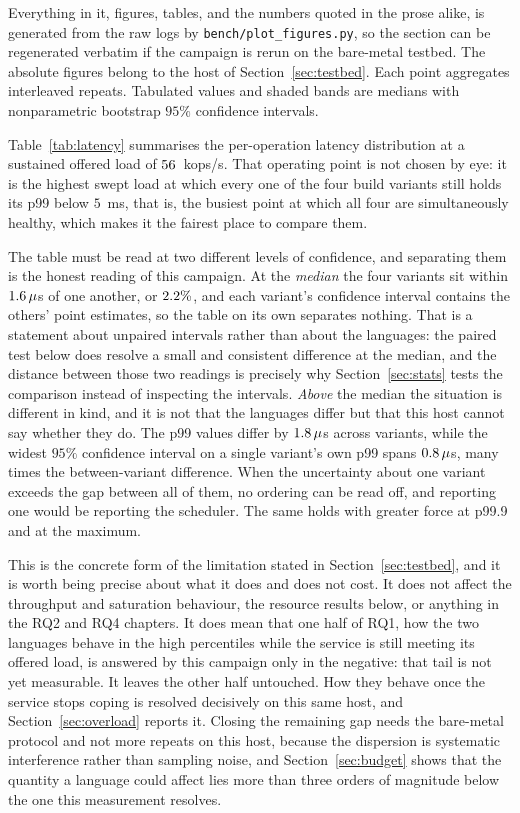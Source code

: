 \documentclass[english,twoside,openright,a4paper,censored,csm,software-track-2020]{HYthesisML}
\begin{document}
Everything in it, figures, tables, and the numbers quoted in the prose alike, is generated from
the raw logs by \texttt{bench/plot\_figures.py}, so the section can be regenerated verbatim if
the campaign is rerun on the bare-metal testbed. The absolute figures belong to the host of
Section~\ref{sec:testbed}. Each point aggregates \NRepeats{} interleaved repeats. Tabulated
values and shaded bands are medians with nonparametric bootstrap $95\%$ confidence intervals.

Table~\ref{tab:latency} summarises the per-operation latency distribution at a sustained
offered load of $56$~kops/s. That operating point is not chosen by eye: it is the
highest swept load at which every one of the four build variants still holds its p99 below
$5$~ms, that is, the busiest point at which all four are simultaneously healthy, which makes
it the fairest place to compare them.

The table must be read at two different levels of confidence, and separating them is the
honest reading of this campaign. At the \emph{median} the four variants sit within
$1.6\,\mu$s of one another, or $2.2\%$, and each variant's confidence
interval contains the others' point estimates, so the table on its own separates nothing.
That is a statement about unpaired intervals rather than about the languages: the paired test
below does resolve a small and consistent difference at the median, and the distance between
those two readings is precisely why Section~\ref{sec:stats} tests the comparison instead of
inspecting the intervals. \emph{Above} the median the situation is different in kind, and it
is not that the languages differ but that this host cannot say whether they do. The p99 values differ by
$1.8\,\mu$s across variants, while the widest $95\%$ confidence interval on a
single variant's own p99 spans $0.8\,\mu$s, many times the between-variant
difference. When the uncertainty about one variant exceeds the gap between all of them, no
ordering can be read off, and reporting one would be reporting the scheduler. The same holds
with greater force at p99.9 and at the maximum.

This is the concrete form of the limitation stated in Section~\ref{sec:testbed}, and it is
worth being precise about what it does and does not cost. It does not affect the throughput
and saturation behaviour, the resource results below, or anything in the RQ2 and RQ4 chapters.
It does mean that one half of RQ1, how the two languages behave in the high percentiles while
the service is still meeting its offered load, is answered by this campaign only in the
negative: that tail is not yet measurable. It leaves the other half untouched. How they behave
once the service stops coping is resolved decisively on this same host, and
Section~\ref{sec:overload} reports it. Closing the remaining gap needs the bare-metal protocol and not more repeats on this
host, because the dispersion is systematic interference rather than sampling noise, and
Section~\ref{sec:budget} shows that the quantity a language could affect lies more than three
orders of magnitude below the one this measurement resolves.
\end{document}

